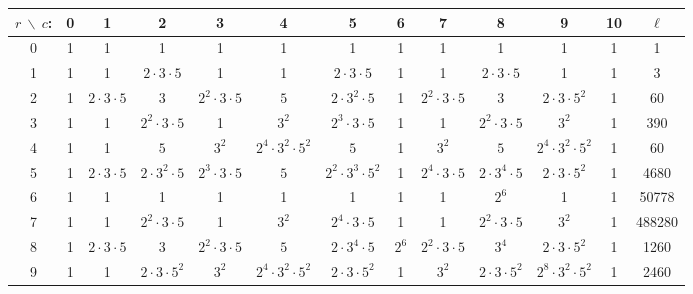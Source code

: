 \begin{table}\label{tab:n30}
  \begin{center}
    \begin{adjustbox}{max width=\textwidth}
    \begin{tabular}{|c|ccccccccccc|c|}
      \hline
$r\ \backslash\ c$:&0 &1 &2 &3 &4 &5 &6 &7 &8 &9 &10  &$\ell$ \\
      \hline
      \hline

0& 1&1&1&1&1&1&1&1&1&1&1&1\\ 
1& 1&1& $2\cdot 3\cdot 5$&1&1& $2\cdot 3\cdot 5$&1&1& $2\cdot 3\cdot 5$&1&1&3\\
2& 1& $2\cdot 3\cdot 5$& $3$& $2^2\cdot 3\cdot 5$& $5$& $2\cdot 3^2\cdot 5$&1& $2^2\cdot 3\cdot 5$& $3$& $2\cdot 3\cdot 5^2$&1&60\\
3& 1&1& $2^2\cdot 3\cdot 5$&1& $3^2$& $2^3\cdot 3\cdot 5$&1&1& $2^2\cdot 3\cdot 5$& $3^2$&1&390\\
4& 1&1& $5$& $3^2$& $2^4\cdot 3^2\cdot 5^2$& $5$&1& $3^2$& $5$& $2^4\cdot 3^2\cdot 5^2$&1&60\\
5& 1& $2\cdot 3\cdot 5$& $2\cdot 3^2\cdot 5$& $2^3\cdot 3\cdot 5$& $5$& $2^2\cdot 3^3\cdot 5^2$&1& $2^4\cdot 3\cdot 5$& $2\cdot 3^4\cdot 5$& $2\cdot 3\cdot 5^2$&1&4680\\
6& 1&1&1&1&1&1&1&1& $2^6$&1&1&50778\\
7& 1&1& $2^2\cdot 3\cdot 5$&1& $3^2$& $2^4\cdot 3\cdot 5$&1&1& $2^2\cdot 3\cdot 5$& $3^2$&1&488280\\
8& 1& $2\cdot 3\cdot 5$& $3$& $2^2\cdot 3\cdot 5$& $5$& $2\cdot 3^4\cdot 5$& $2^6$& $2^2\cdot 3\cdot 5$& $3^4$& $2\cdot 3\cdot 5^2$&1&1260\\
9& 1&1& $2\cdot 3\cdot 5^2$& $3^2$& $2^4\cdot 3^2\cdot 5^2$& $2\cdot 3\cdot 5^2$&1& $3^2$& $2\cdot 3\cdot 5^2$& $2^8\cdot 3^2\cdot 5^2$&1&2460\\

\end{tabular}
\end{adjustbox}
\end{center}
\end{table}

